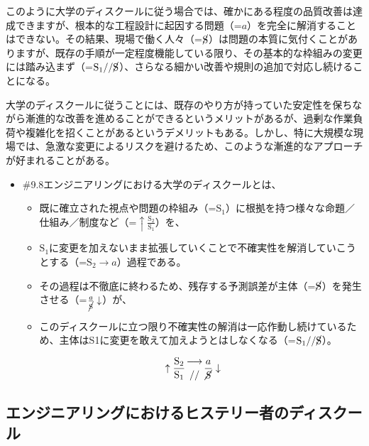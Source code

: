 このように大学のディスクールに従う場合では、確かにある程度の品質改善は達成できますが、根本的な工程設計に起因する問題（=\(a\)）を完全に解消することはできない。その結果、現場で働く人々（=\(\cancel{\textrm{S}}\)）は問題の本質に気付くことがありますが、既存の手順が一定程度機能している限り、その基本的な枠組みの変更には踏み込まず（=\(\textrm{S}_1//\cancel{\textrm{S}}\)）、さらなる細かい改善や規則の追加で対応し続けることになる。

大学のディスクールに従うことには、既存のやり方が持っていた安定性を保ちながら漸進的な改善を進めることができるというメリットがあるが、過剰な作業負荷や複雑化を招くことがあるというデメリットもある。しかし、特に大規模な現場では、急激な変更によるリスクを避けるため、このような漸進的なアプローチが好まれることがある。

\begin{note}{}
  \begin{itemize}
    \tightlist
    \item{\#9.8}エンジニアリングにおける大学のディスクールとは、
      \begin{itemize}
        \tightlist
        \item 既に確立された視点や問題の枠組み（=$\textrm{S}_1$）に根拠を持つ様々な命題／仕組み／制度など（=$\uparrow\frac{\textrm{S}_2}{\textrm{S}_1}$）を、
        \item $\textrm{S}_1$に変更を加えないまま拡張していくことで不確実性を解消していこうとする（=$\textrm{S}_2\rightarrow a$）過程である。
        \item その過程は不徹底に終わるため、残存する予測誤差が主体（=$\cancel{\textrm{S}}$）を発生させる（=$\frac{a}{\cancel{\textrm{S}}}\downarrow$）が、
        \item このディスクールに立つ限り不確実性の解消は一応作動し続けているため、主体はS1に変更を敢えて加えようとはしなくなる（=$\textrm{S}_1//\cancel{\textrm{S}}$）。
      \end{itemize}

$$
\uparrow\frac{\mathrm{S_2}}{\mathrm{S_1}}\genfrac{}{}{0pt}{}{\longrightarrow}{//}\frac{a}{\mathrm{\cancel{S}}}\downarrow
$$
  \end{itemize}
\end{note}

\subsection{エンジニアリングにおけるヒステリー者のディスクール}\label{ux30a8ux30f3ux30b8ux30cbux30a2ux30eaux30f3ux30b0ux306bux304aux3051ux308bux30d2ux30b9ux30c6ux30eaux30fcux8005ux306eux30c7ux30a3ux30b9ux30afux30fcux30eb}

